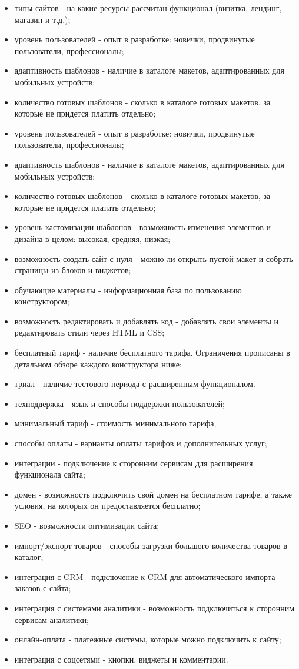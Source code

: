 \begin{itemize}
    \item типы сайтов - на какие ресурсы рассчитан функционал (визитка, лендинг, магазин и т.д.);
    \item уровень пользователей - опыт в разработке: новички, продвинутые пользователи, профессионалы;
    \item адаптивность шаблонов - наличие в каталоге макетов, адаптированных для мобильных устройств;
    \item количество готовых шаблонов - сколько в каталоге готовых макетов, за которые не придется платить отдельно;
    \item уровень пользователей - опыт в разработке: новички, продвинутые пользователи, профессионалы;
    \item адаптивность шаблонов - наличие в каталоге макетов, адаптированных для мобильных устройств;
    \item количество готовых шаблонов - сколько в каталоге готовых макетов, за которые не придется платить отдельно;
    \item уровень кастомизации шаблонов - возможность изменения элементов и дизайна в целом: высокая, средняя, низкая;
    \item возможность создать сайт с нуля - можно ли открыть пустой макет и собрать страницы из блоков и виджетов;
    \item обучающие материалы - информационная база по пользованию конструктором;
    \item возможность редактировать и добавлять код - добавлять свои элементы и редактировать стили через HTML и CSS;
    \item бесплатный тариф - наличие бесплатного тарифа. Ограничения прописаны в детальном обзоре каждого конструктора ниже;
    \item триал - наличие тестового периода с расширенным функционалом.
    \item техподдержка - язык и способы поддержки пользователей;
    \item минимальный тариф - стоимость минимального тарифа;
    \item способы оплаты - варианты оплаты тарифов и дополнительных услуг;
    \item интеграции - подключение к сторонним сервисам для расширения функционала сайта;
    \item домен - возможность подключить свой домен на бесплатном тарифе, а также условия, на которых он предоставляется бесплатно;
    \item SEO - возможности оптимизации сайта;
    \item импорт/экспорт товаров - способы загрузки большого количества товаров в каталог;
    \item интеграция с CRM - подключение к CRM для автоматического импорта заказов с сайта;
    \item интеграция с системами аналитики - возможность подключиться к сторонним сервисам аналитики;
    \item онлайн-оплата - платежные системы, которые можно подключить к сайту;
    \item интеграция с соцсетями - кнопки, виджеты и комментарии.
\end{itemize}

